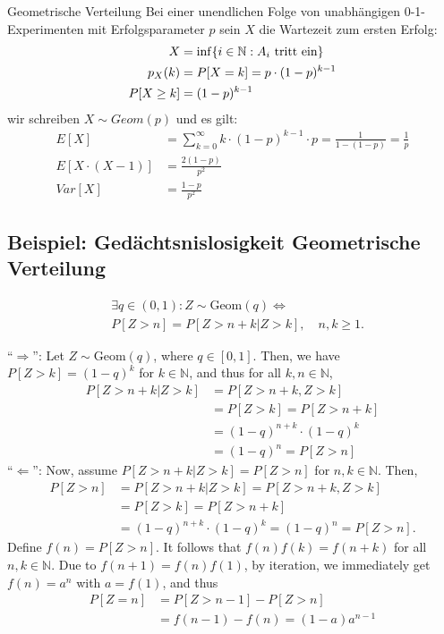 \begin{definition}{Geometrische Verteilung}
  Bei einer unendlichen Folge von unabhängigen 0-1-Experimenten mit
  Erfolgsparameter $p$ sein $X$ die Wartezeit zum ersten Erfolg:
  \begin{align*}
    X           & = \inf \{ i \in \mathbb{N} : A_i \text{ tritt ein} \} \\
    p_X (k)     & = P[X = k] = p \cdot  (1-p)^{k-1}             \\
    P[X \geq k] & = (1 - p)^{k - 1}
  \end{align*}
  wir schreiben $X \sim Geom (p)$ und es gilt:
  \begin{align*}
    E[X]              & = \sum_{k = 0}^\infty  k \cdot (1-p)^{k-1} \cdot p
    = \frac{1}{1- (1-p)} = \frac{1}{p}                                     \\
    E[X \cdot  (X-1)] & = \frac{2 (1-p)}{p^2}                              \\
    Var[X]            & = \frac{1-p}{p^2}
  \end{align*}
\end{definition}
\BoxStart{}
\subsection{Beispiel: Gedächtsnislosigkeit Geometrische Verteilung}
\begin{align*}
   & \exists q \in (0, 1) : Z \sim \text{Geom}(q) \Leftrightarrow \\
   & P[Z > n] = P[Z > n + k | Z > k], \quad n, k \geq 1.
\end{align*}

``$\Rightarrow$'': Let $Z \sim \text{Geom}(q)$, where $q \in [0, 1]$. Then, we have $P[Z > k] = (1 - q)^k$ for $k \in \mathbb{N}$, and thus for all $k, n \in \mathbb{N}$,
\begin{align*}
  P[Z > n + k | Z > k] & = P[Z > n + k, Z > k]           \\
                       & = P[Z > k] = P[Z > n + k]       \\
                       & = (1 - q)^{n+k} \cdot (1 - q)^k \\
                       & = (1 - q)^n = P[Z > n]
\end{align*}
``$\Leftarrow$'': Now, assume $P[Z > n + k | Z > k] = P[Z > n]$ for $n, k \in \mathbb{N}$. Then,
\begin{align*}
  P[Z > n] & = P[Z > n + k | Z > k] = P[Z > n + k, Z > k]            \\
           & = P[Z > k] = P[Z > n + k]                               \\
           & = (1 - q)^{n+k} \cdot (1 - q)^k = (1 - q)^n = P[Z > n].
\end{align*}
Define $f(n) = P[Z > n]$. It follows that $f(n)f(k) = f(n + k)$ for all $n, k \in \mathbb{N}$. Due to $f(n + 1) = f(n)f(1)$, by iteration, we immediately get $f(n) = a^n$ with $a = f(1)$, and thus
\begin{align*}
  P[Z = n] & = P[Z > n - 1] - P[Z > n]          \\
           & = f(n - 1) - f(n) = (1 - a)a^{n-1}
\end{align*}

